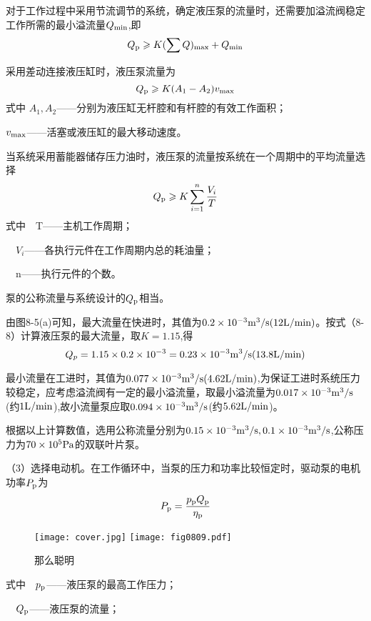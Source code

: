 对于工作过程中采用节流调节的系统，确定液压泵的流量时，还需要加溢流阀稳定工作所需的最小溢流量$Q_{\rm min}$,即
\begin{equation}
    Q_{\rm p}\geqslant K(\sum Q)_{\rm max}+Q_{\rm min}
\end{equation}

采用差动连接液压缸时，液压泵流量为
\begin{equation}
    Q_{\rm p}\geqslant K(A_1 -A_2)v_{\rm max}
\end{equation}
式中 $A_1,A_2$——分别为液压缸无杆腔和有杆腔的有效工作面积；

    $v_{\rm max}$——活塞或液压缸的最大移动速度。
  
当系统采用蓄能器储存压力油时，液压泵的流量按系统在一个周期中的平均流量选择
\begin{equation}
    Q_{\rm p}\geqslant K\sum_{i = 1}^{n} \frac{V_i}{T}
\end{equation}
式中$\quad$T——主机工作周期；

$\quad V_i$——各执行元件在工作周期内总的耗油量；
       
$\quad$n——执行元件的个数。

泵的公称流量与系统设计的$Q_{\rm p}$相当。

由图8-5(a)可知，最大流量在快进时，其值为$0.2\times10^{-3}{\rm m^3/s(12L/min)}$。按式（8-8）计算液压泵的最大流量，取$K=1.15$,得
$$Q_p=1.15\times0.2\times10^{-3}=0.23\times10^{-3}{\rm m^{3}/s(13.8L/min)}$$

最小流量在工进时，其值为$0.077\times10^{-3}{\rm m^{3}/s(4.62L/min)}$,为保证工进时系统压力较稳定，应考虑溢流阀有一定的最小溢流量，取最小溢流量为$0.017\times10^{-3}{\rm m^{3}/s}$(约$1{\rm L/min}$),故小流量泵应取$0.094\times10^{-3}{\rm m^{3}/s}$(约$5.62{\rm L/min}$)。

根据以上计算数值，选用公称流量分别为$0.15\times10^{-3}{\rm m^3/s},0.1\times10^{-3}{\rm m^{3}/s}$,公称压力为$70\times10^5{\rm Pa}$的双联叶片泵。

（3）选择电动机。在工作循环中，当泵的压力和功率比较恒定时，驱动泵的电机功率$P_{\rm p}$为
\begin{equation}
    P_{\rm p}=\frac{p_{\rm p}Q_{\rm p}}{\eta _{\rm p}}
\end{equation}
\begin{figure}
\centering
\ifOpenSource
\texttt{[image: cover.jpg]}
\else
\texttt{[image: fig0809.pdf]}
\fi
\caption{那么聪明}
\label{fig:fig0809}
\end{figure}
式中$\quad p_{\rm p}$——液压泵的最高工作压力；

$\quad Q_{\rm p}$——液压泵的流量；

